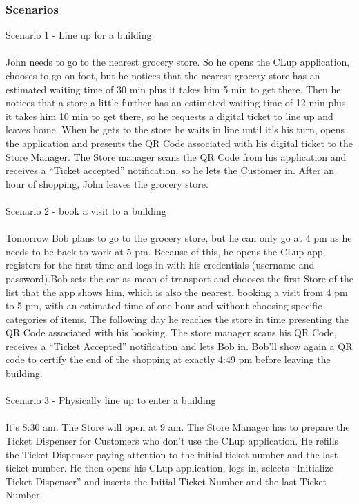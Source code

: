 \documentclass{article}
\begin{document}
	\subsubsection{Scenarios}
	{\large{Scenario 1 - Line up for a building}} \\
	\\
	John needs to go to the nearest grocery store. So he opens the CLup application, chooses to go on foot, but he notices that the nearest grocery store has an estimated waiting time of 30 min plus it takes him 5 min to get there. Then he notices that a store a little further has an estimated waiting time of 12 min plus it takes him 10 min to get there, so he requests a digital ticket to line up and leaves home.
When he gets to the store he waits in line until it’s his turn, opens the application and presents the QR Code associated with his digital ticket to the Store Manager.
The Store manager scans the QR Code from his application and receives a “Ticket accepted” notification, so he lets the Customer in.
After an hour of shopping, John leaves the grocery store. \\
\\
	{\large{Scenario 2 - book a visit to a building}} \\
	\\
	Tomorrow Bob plans to go to the grocery store, but he can only go at 4 pm as he needs to be back to work at 5 pm. Because of this, he opens the CLup app, registers for the first time and logs in with his credentials (username and password).Bob sets the car as mean of transport and chooses the first Store of the list that the app shows him, which is also the nearest, booking a visit from 4 pm to 5 pm, with an estimated time of one hour and without choosing specific categories of items.
The following day he reaches the store in time presenting the QR Code associated with his booking. The store manager scans his QR Code, receives a “Ticket Accepted” notification and lets Bob in.
Bob’ll show again a QR code to certify the end of the shopping at exactly 4:49 pm before leaving the building. \\
\\
	{\large{Scenario 3 - Physically line up to enter a building} }\\
	\\
	It’s 8:30 am. The Store will open at 9 am. The Store Manager has to prepare the Ticket Dispenser for Customers who don’t use the CLup application. He refills the Ticket Dispenser paying attention to the initial ticket number and the last ticket number. He then opens his CLup application, logs in, selects “Initialize Ticket Dispenser'' and inserts the Initial Ticket Number and the last Ticket Number. \\
\end{document}
